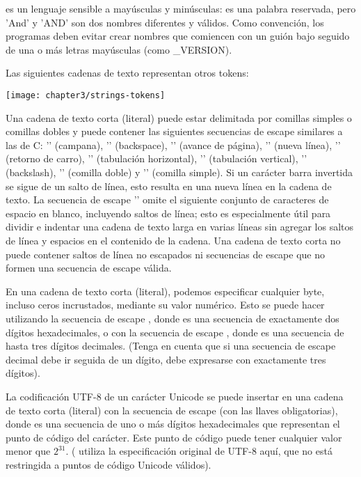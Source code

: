  es un lenguaje sensible a mayúsculas y minúsculas:  es una palabra reservada, pero 'And' y 'AND' son dos nombres diferentes y válidos. Como convención, los programas deben evitar crear nombres que comiencen con un guión bajo seguido de una o más letras mayúsculas (como \_VERSION).

Las siguientes cadenas de texto representan otros tokens:
\begin{center}
	\texttt{[image: chapter3/strings-tokens]} %
\end{center}

Una cadena de texto corta (literal) puede estar delimitada por comillas simples o comillas dobles y puede contener las siguientes secuencias de escape similares a las de C: '' (campana), '' (backspace), '' (avance de página), '' (nueva línea), '' (retorno de carro), '' (tabulación horizontal), '' (tabulación vertical), '\texthigh{\textbackslash \textbackslash}' (backslash), '' (comilla doble) y '' (comilla simple). Si un carácter barra invertida se sigue de un salto de línea, esto resulta en una nueva línea en la cadena de texto. La secuencia de escape '' omite el siguiente conjunto de caracteres de espacio en blanco, incluyendo saltos de línea; esto es especialmente útil para dividir e indentar una cadena de texto larga en varias líneas sin agregar los saltos de línea y espacios en el contenido de la cadena. Una cadena de texto corta no puede contener saltos de línea no escapados ni secuencias de escape que no formen una secuencia de escape válida.

En una cadena de texto corta (literal), podemos especificar cualquier byte, incluso ceros incrustados, mediante su valor numérico. Esto se puede hacer utilizando la secuencia de escape , donde  es una secuencia de exactamente dos dígitos hexadecimales, o con la secuencia de escape , donde  es una secuencia de hasta tres dígitos decimales. (Tenga en cuenta que si una secuencia de escape decimal debe ir seguida de un dígito, debe expresarse con exactamente tres dígitos).

La codificación UTF-8 de un carácter Unicode se puede insertar en una cadena de texto corta (literal) con la secuencia de escape  (con las llaves obligatorias), donde  es una secuencia de uno o más dígitos hexadecimales que representan el punto de código del carácter. Este punto de código puede tener cualquier valor menor que $2^{31}$. ( utiliza la especificación original de UTF-8 aquí, que no está restringida a puntos de código Unicode válidos).

